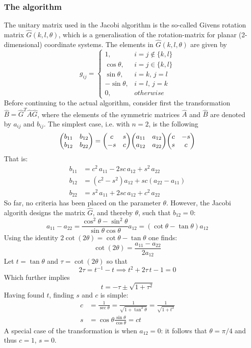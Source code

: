 \documentclass[reprint,english]{revtex4-1}
\begin{document}
\subsubsection{The algorithm}
The unitary matrix used in the Jacobi algorithm is the so-called Givens rotation matrix \(\hat{G}(k,l,\theta)\), which is a generalisation of the rotation-matrix for planar (2-dimensional) coordinate systems. The elements in \(\hat{G}(k,l,\theta)\) are given by
\begin{equation}\label{eq:Givens_rotation_matrix}
g_{ij}=\begin{cases}1,&i=j\notin\{k,l\} \\ \cos\theta,&i=j\in\{k,l\} \\ \sin\theta,&i=k,\,j=l \\ -\sin\theta,&i=l,\,j=k \\ 0,&otherwise\end{cases}
\end{equation}
Before continuing to the actual algorithm, consider first the transformation \(\hat{B}=\hat{G}^T\hat{A}\hat{G}\), where the elements of the symmetric matrices \(\hat{A}\) and \(\hat{B}\) are denoted by \(a_{ij}\) and \(b_{ij}\). The simplest case, i.e. with \(n=2\), is the following
\[\mqty(b_{11}&b_{12}\\b_{12}&b_{22})=\mqty(c&s\\-s&c)\mqty(a_{11}&a_{12}\\a_{12}&a_{22})\mqty(c&-s\\s&c)\]
That is:
\begin{align*}
b_{11}&=c^2\,a_{11}-2sc\,a_{12}+s^2\,a_{22}\\
b_{12}&=(c^2-s^2)a_{12}+sc(a_{22}-a_{11})\\
b_{22}&=s^2\,a_{11}+2sc\,a_{12}+c^2\,a_{22}
\end{align*}
So far, no criteria has been placed on the parameter \(\theta\). However, the Jacobi algorith designs the matrix \(\hat{G}\), and thereby \(\theta\), such that \(b_{12}=0\):
\[a_{11}-a_{22}=\frac{\cos^2\theta-\sin^2\theta}{\sin\theta\cos\theta}a_{12}=(\cot\theta-\tan\theta)a_{12}\]
Using the identity \(2\cot(2\theta)=\cot\theta-\tan\theta\) one finds:
\[\cot(2\theta)=\frac{a_{11}-a_{22}}{2a_{12}}\]
Let \(t=\tan\theta\) and \(\tau=\cot(2\theta)\) so that
\[2\tau=t^{-1}-t\implies t^2+2\tau\,t-1=0\]
Which further implies
\begin{equation}\label{eq:jacobi_algorithm_t}
t=-\tau\pm\sqrt{1+\tau^2}
\end{equation}
Having found \(t\), finding \(s\) and \(c\) is simple:
\begin{subequations}\label{eq:jacobi_algorithm_cs}
\begin{align}
c&=\frac{1}{\sec\theta}=\frac{1}{\sqrt{1+\tan^2\theta}}=\frac{1}{\sqrt{1+t^2}}\\
s&=\cos\theta\frac{\sin\theta}{\cos\theta}=ct
\end{align}
\end{subequations}
A special case of the transformation is when \(a_{12}=0\): it follows that \(\theta=\pi/4\) and thus \(c=1\), \(s=0\).
\end{document}
